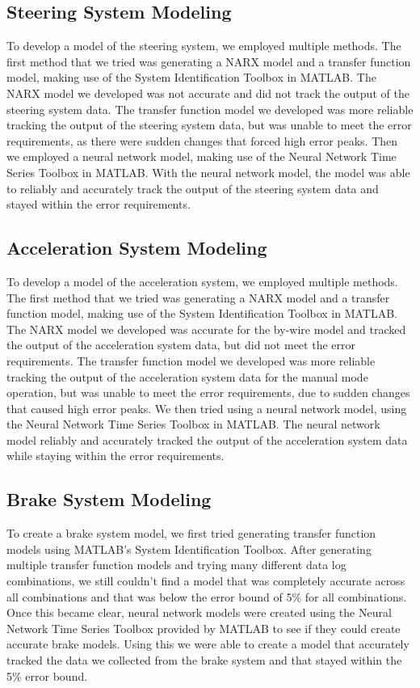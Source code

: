 \documentclass[conference]{IEEEtran}
\begin{document}
\subsection{Steering System Modeling}
To develop a model of the steering system, we employed multiple methods. The first method that we tried was generating a NARX model and a transfer function model, making use of the System Identification Toolbox in MATLAB. The NARX model we developed was not accurate and did not track the output of the steering system data. The transfer function model we developed was more reliable tracking the output of the steering system data, but was unable to meet the error requirements, as there were sudden changes that forced high error peaks. Then we employed a neural network model, making use of the Neural Network Time Series Toolbox in MATLAB. With the neural network model, the model was able to reliably and accurately track the output of the steering system data and stayed within the error requirements.

\subsection{Acceleration System Modeling}
To develop a model of the acceleration system, we employed multiple methods. The first method that we tried was generating a NARX model and a transfer function model, making use of the System Identification Toolbox in MATLAB. The NARX model we developed was accurate for the by-wire model and tracked the output of the acceleration system data, but did not meet the error requirements. The transfer function model we developed was more reliable tracking the output of the acceleration system data for the manual mode operation, but was unable to meet the error requirements, due to sudden changes that caused high error peaks. We then tried using a neural network model, using the Neural Network Time Series Toolbox in MATLAB. The neural network model reliably and accurately tracked the output of the acceleration system data while staying within the error requirements.

\subsection{Brake System Modeling}
To create a brake system model, we first tried generating transfer function models using MATLAB’s System Identification Toolbox. After generating multiple transfer function models and trying many different data log combinations, we still couldn’t find a model that was completely accurate across all combinations and that was below the error bound of 5\% for all combinations. Once this became clear, neural network models were created using the Neural Network Time Series Toolbox provided by MATLAB to see if they could create accurate brake models. Using this we were able to create a model that accurately tracked the data we collected from the brake system and that stayed within the 5\% error bound.
\end{document}
